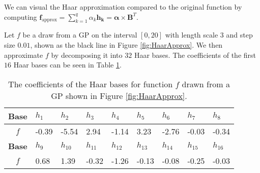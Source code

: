 \documentclass[../main.tex]{subfiles}
\begin{document}
We can visual the Haar approximation compared to the original function by  computing $\mathbf{f_{\mathrm{approx}}} = \sum^q_{k=1} \alpha_k \mathbf{h_k} = \bm{\alpha} \times \mathbf{B}^T$.

 
Let $f$ be a draw from a GP on the interval $[0,20]$ with length scale $3$ and step size $0.01$, shown as the black line in Figure \ref{fig:HaarApprox}. We then approximate $f$ by decomposing it into $32$ Haar bases. The coefficients of the first $16$ Haar bases can be seen in Table \ref{table:HaarCoef}.

\begin{table}[h!]
  \begin{center}
    \label{table:Haar}
    \begin{tabular}{|c|l|l|l|l|l|l|l|l|}
    \hline
      \textbf{Base} & $h_{1}$ & $h_{2}$ & $h_{3}$  & $h_{4}$ & $h_{5}$ & $h_{6}$ & $h_{7}$ & $h_{8}$ \\ 
      \hline
     $f$ &-0.39 & -5.54 & 2.94 & -1.14 & 3.23 & -2.76 & -0.03 & -0.34  \\ \hline
     \hline
 \textbf{Base} & $h_{9}$ & $h_{10}$ & $h_{11}$  & $h_{12}$ & $h_{13}$ & $h_{14}$ & $h_{15}$ & $h_{16}$ \\ \hline
 	 $f$ & 0.68 & 1.39& -0.32& -1.26& -0.13& -0.08& -0.25& -0.03  \\ \hline
    \end{tabular}
    \caption{The coefficients of the Haar bases for function $f$ drawn from a GP shown in Figure \ref{fig:HaarApprox}. }
    \label{table:HaarCoef}
  \end{center}
\end{table} 
\end{document}
